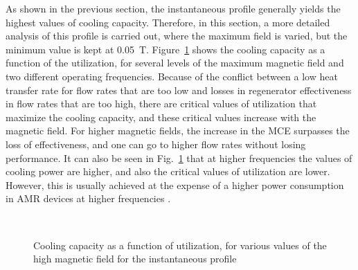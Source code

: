 \documentclass[referee]{svjour3}
\begin{document}
As shown in the previous section, the instantaneous profile generally yields the highest values of cooling capacity. Therefore, in this section, a more detailed analysis of this profile is carried out, where the maximum field is varied, but the minimum value is kept at \SI{0.05}{\tesla}. Figure~\ref{fig:qc_phi_inst} shows the cooling capacity as a function of the utilization, for several levels of the maximum magnetic field and two different operating frequencies. Because of the conflict between a low heat transfer rate for flow rates that are too low and losses in regenerator effectiveness in flow rates that are too high, there are critical values of utilization that maximize the cooling capacity, and these critical values increase with the magnetic field. For higher magnetic fields, the increase in the MCE surpasses the loss of effectiveness, and one can go to higher flow rates without losing performance. It can also be seen in Fig.~\ref{fig:qc_phi_inst} that at  higher frequencies the values of cooling power are higher, and also the critical values of utilization are lower. However, this is usually achieved at the expense of a higher power consumption in AMR devices at higher frequencies \cite{bib:lei15_study,NIKNIA2016601}.

\begin{figure}[!ht]
  \centering
{}
\,
  \caption{Cooling capacity as a function of utilization, for various values of the high magnetic field  for the instantaneous profile}
  \label{fig:qc_phi_inst}
\end{figure}
\end{document}
